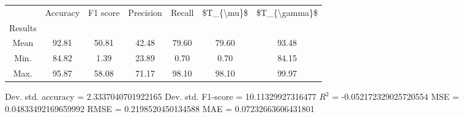 \begin{tabular}{|c|c|c|c|c|c|c|}
\toprule
{} &  Accuracy &  F1 score &  Precision &  Recall &  \$T\_\{\textbackslash mu\}\$ &  \$T\_\{\textbackslash gamma\}\$ \\
Results &           &           &            &         &            &               \\
\hline
Mean    &     92.81 &     50.81 &      42.48 &   79.60 &      79.60 &         93.48 \\
Min.    &     84.82 &      1.39 &      23.89 &    0.70 &       0.70 &         84.15 \\
Max.    &     95.87 &     58.08 &      71.17 &   98.10 &      98.10 &         99.97 \\
\bottomrule
\end{tabular}

 Dev. std. accuracy = 2.3337040701922165
 Dev. std. F1-score = 10.11329927316477
 $R^2$ = -0.052172329025720554
 MSE = 0.04833492169659992
 RMSE = 0.2198520450134588
 MAE = 0.07232663606431801
